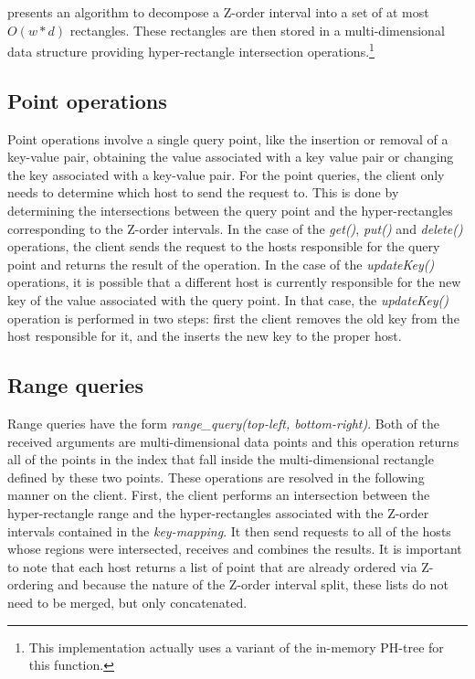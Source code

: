 \documentclass[11pt,a4paper]{globis-book}
\begin{document}
\cite{skopal2006-ubtree} presents an algorithm to decompose a Z-order interval into a set of at most $O(w*d)$ rectangles. These rectangles are then stored in a multi-dimensional data structure providing hyper-rectangle intersection operations.\footnote{This implementation actually uses a variant of the in-memory PH-tree for this function.}

\subsection{Point operations}
Point operations involve a single query point, like the insertion or removal of a key-value pair, obtaining the value associated with a key value pair or changing the key associated with a key-value pair. For the point queries, the client only needs to determine which host to send the request to. This is done by determining the intersections between the query point and the hyper-rectangles corresponding to the Z-order intervals. In the case of the \textit{get()}, \textit{put()} and \textit{delete()} operations, the client sends the request to the hosts responsible for the query point and returns the result of the operation. In the case of the \textit{updateKey()} operations, it is possible that a different host is currently responsible for the new key of the value associated with the query point. In that case, the \textit{updateKey()} operation is performed in two steps: first the client removes the old key from the host responsible for it, and the inserts the new key to the proper host.

\subsection{Range queries}

Range queries have the form \textit{range\_query(top-left, bottom-right)}. Both of the received arguments are multi-dimensional data points and this operation returns all of the points in the index that fall inside the multi-dimensional rectangle defined by these two points. These operations are resolved in the following manner on the client. First, the client performs an intersection between the hyper-rectangle range and the hyper-rectangles associated with the Z-order intervals contained in the \textit{key-mapping}. It then send requests to all of the hosts whose regions were intersected, receives and combines the results. It is important to note that each host returns a list of point that are already ordered via Z-ordering and because the nature of the Z-order interval split, these lists do not need to be merged, but only concatenated.
\end{document}
